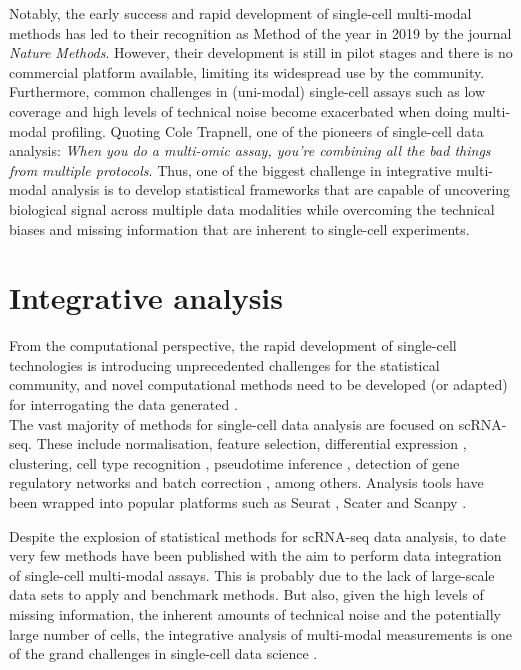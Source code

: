 Notably, the early success and rapid development of single-cell multi-modal methods has led to their recognition as Method of the year in 2019 by the journal \textit{Nature Methods}\cite{NatMethods2020}. However, their development is still in pilot stages and there is no commercial platform available, limiting its widespread use by the community. Furthermore, common challenges in (uni-modal) single-cell assays such as low coverage and high levels of technical noise become exacerbated when doing multi-modal profiling. Quoting Cole Trapnell, one of the pioneers of single-cell data analysis: \textit{When you do a multi-omic assay, you're combining all the bad things from multiple protocols}\cite{Eisenstein2020}. Thus, one of the biggest challenge in integrative multi-modal analysis is to develop statistical frameworks that are capable of uncovering biological signal across multiple data modalities while overcoming the technical biases and missing information that are inherent to single-cell experiments. 


\section{Integrative analysis}

From the computational perspective, the rapid development of single-cell technologies is introducing unprecedented challenges for the statistical community, and novel computational methods need to be developed (or adapted) for interrogating the data generated \cite{Stegle2015}.\\
The vast majority of methods for single-cell data analysis are focused on scRNA-seq. These include normalisation\cite{Lun2016a}, feature selection\cite{Townes2019}, differential expression \cite{Kharchenko2014}, clustering\cite{Kiselev2017}, cell type recognition \cite{Abdelaal2019}, pseudotime inference \cite{Haghverdi2016}, detection of gene regulatory networks and batch correction \cite{Haghverdi2018}, among others. Analysis tools have been wrapped into popular platforms such as Seurat \cite{Butler2018}, Scater \cite{McCarthy2017} and Scanpy \cite{Wolf2018}.

Despite the explosion of statistical methods for scRNA-seq data analysis, to date very few methods have been published  with the aim to perform data integration of single-cell multi-modal assays. This is probably due to the lack of large-scale data sets to apply and benchmark methods. But also, given the high levels of missing information, the inherent amounts of technical noise and the potentially large number of cells, the integrative analysis of multi-modal measurements is one of the grand challenges in single-cell data science \cite{Lahnemann2020}.

